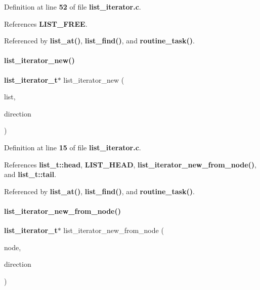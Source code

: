 Definition at line \textbf{ 52} of file \textbf{ list\+\_\+iterator.\+c}.



References \textbf{ L\+I\+S\+T\+\_\+\+F\+R\+EE}.



Referenced by \textbf{ list\+\_\+at()}, \textbf{ list\+\_\+find()}, and \textbf{ routine\+\_\+task()}.

\mbox{\label{list__iterator_8c_a3c956afda343b4a6aaf68fbd4b446733}} 
\paragraph{list\+\_\+iterator\+\_\+new()}
{\footnotesize\ttfamily \textbf{ list\+\_\+iterator\+\_\+t}$\ast$ list\+\_\+iterator\+\_\+new (\begin{DoxyParamCaption}\item[{\textbf{ list\+\_\+t} $\ast$}]{list,  }\item[{\textbf{ list\+\_\+direction\+\_\+t}}]{direction }\end{DoxyParamCaption})}



Definition at line \textbf{ 15} of file \textbf{ list\+\_\+iterator.\+c}.



References \textbf{ list\+\_\+t\+::head}, \textbf{ L\+I\+S\+T\+\_\+\+H\+E\+AD}, \textbf{ list\+\_\+iterator\+\_\+new\+\_\+from\+\_\+node()}, and \textbf{ list\+\_\+t\+::tail}.



Referenced by \textbf{ list\+\_\+at()}, \textbf{ list\+\_\+find()}, and \textbf{ routine\+\_\+task()}.

\mbox{\label{list__iterator_8c_af4136a8a27bdc8c0f967a708dd03d575}} 
\paragraph{list\+\_\+iterator\+\_\+new\+\_\+from\+\_\+node()}
{\footnotesize\ttfamily \textbf{ list\+\_\+iterator\+\_\+t}$\ast$ list\+\_\+iterator\+\_\+new\+\_\+from\+\_\+node (\begin{DoxyParamCaption}\item[{\textbf{ list\+\_\+node\+\_\+t} $\ast$}]{node,  }\item[{\textbf{ list\+\_\+direction\+\_\+t}}]{direction }\end{DoxyParamCaption})}



